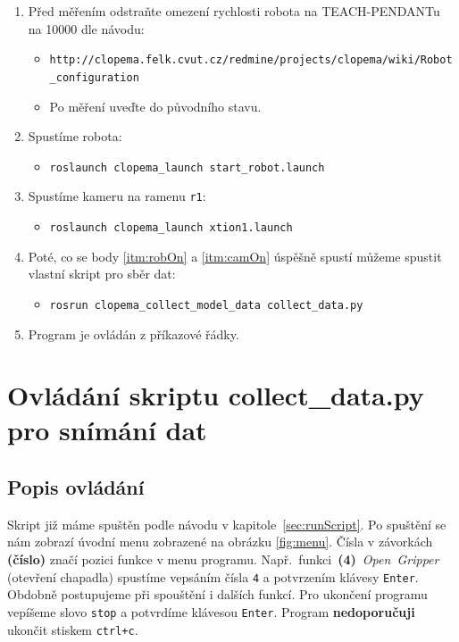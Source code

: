 \documentclass[10pt,a4paper,titlepage,oneside]{report}
\begin{document}
\begin{enumerate}
 
  \item Před měřením odstraňte omezení rychlosti robota na TEACH-PENDANTu na 10000 dle návodu: 
  	\begin{itemize}
   		\item \verb|http://clopema.felk.cvut.cz/redmine/projects/clopema/wiki/Robot_configuration|
   		\item Po měření uveďte do původního stavu.
  	\end{itemize}
   
  
  \item \label{itm:robOn} Spustíme robota: 
  	\begin{itemize}  
  		\item \verb|roslaunch clopema_launch start_robot.launch|
  	\end{itemize}
  
  \item \label{itm:camOn} Spustíme kameru na ramenu \verb|r1|:
  	\begin{itemize}
  		\item \verb|roslaunch clopema_launch xtion1.launch|
 	\end{itemize}
  
  \item Poté, co se body \ref{itm:robOn} a \ref{itm:camOn} úspěšně spustí můžeme spustit vlastní skript pro sběr dat:
  	\begin{itemize}
  		\item \verb|rosrun clopema_collect_model_data collect_data.py|
  	\end{itemize}
  
  \item Program je ovládán z příkazové řádky.
  
\end{enumerate}


\section{Ovládání skriptu collect\_data.py pro snímání dat}
\label{sec:program}

\subsection{Popis ovládání}
Skript již máme spuštěn podle návodu v kapitole~\ref{sec:runScript}. Po spuštění se nám zobrazí úvodní menu zobrazené na obrázku \ref{fig:menu}.
Čísla v závorkách \textbf{(číslo)} značí pozici funkce v menu programu. Např.~funkci~\textbf{(4)}~\textit{Open~Gripper} (otevření chapadla) spustíme vepsáním čísla \verb|4| a potvrzením klávesy \verb|Enter|. Obdobně postupujeme při spouštění i dalších funkcí. Pro ukončení programu vepíšeme slovo \verb|stop| a potvrdíme klávesou \verb|Enter|. Program \textbf{nedoporučuji} ukončit stiskem \verb|ctrl+c|.
\end{document}
